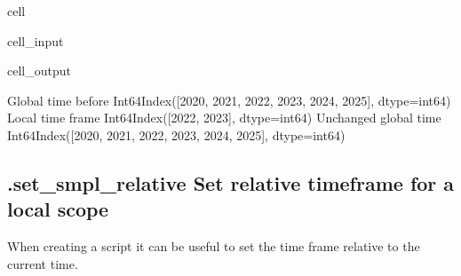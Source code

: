 \documentclass[letterpaper,10pt,english]{jupyterBook}
\begin{document}
\begin{sphinxuseclass}{cell}\begin{sphinxVerbatimInput}

\begin{sphinxuseclass}{cell_input}
\begin{sphinxVerbatim}[commandchars=\\\{\}]
 
\end{sphinxVerbatim}

\end{sphinxuseclass}\end{sphinxVerbatimInput}
\begin{sphinxVerbatimOutput}

\begin{sphinxuseclass}{cell_output}
\begin{sphinxVerbatim}[commandchars=\\\{\}]
Global time  before   Int64Index([2020, 2021, 2022, 2023, 2024, 2025], dtype=\PYGZsq{}int64\PYGZsq{})
Local time frame      Int64Index([2022, 2023], dtype=\PYGZsq{}int64\PYGZsq{})
Unchanged global time Int64Index([2020, 2021, 2022, 2023, 2024, 2025], dtype=\PYGZsq{}int64\PYGZsq{})
\end{sphinxVerbatim}

\end{sphinxuseclass}\end{sphinxVerbatimOutput}

\end{sphinxuseclass}

\subsection{.set\_smpl\_relative Set relative timeframe for a local scope}
\label{\detokenize{content/notebooks/modelflow_features:set-smpl-relative-set-relative-timeframe-for-a-local-scope}}
\sphinxAtStartPar
When creating a script it can be useful to set the time frame relative to the
current time.
\end{document}
